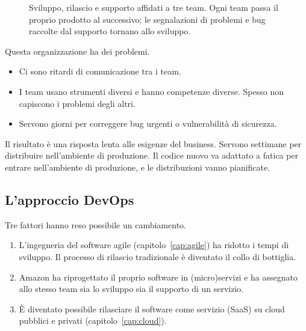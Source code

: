 \begin{figure}[ht]
\centering
{}
\caption{Sviluppo, rilascio e supporto affidati a tre team. Ogni team passa il proprio prodotto al successivo; le
segnalazioni di problemi e bug raccolte dal supporto tornano allo sviluppo.}
\label{fig:devops-team}
\end{figure}

Questa organizzazione ha dei problemi.
\begin{itemize}
  \item Ci sono ritardi di comunicazione tra i team.
  \item I team usano strumenti diversi e hanno competenze diverse. Spesso non capiscono i problemi degli altri.
  \item Servono giorni per correggere bug urgenti o vulnerabilità di sicurezza.
\end{itemize}
Il risultato è una risposta lenta alle esigenze del business. Servono settimane per distribuire nell'ambiente di
produzione. Il codice nuovo va adattato a fatica per entrare nell'ambiente di produzione, e le distribuzioni vanno
pianificate.

\subsection{L'approccio DevOps}
\label{sec:devops-approccio}

Tre fattori hanno reso possibile un cambiamento.
\begin{enumerate}
  \item L'ingegneria del software agile (capitolo~\ref{cap:agile}) ha ridotto i tempi di sviluppo. Il processo di
    rilascio tradizionale è diventato il collo di bottiglia.
  \item Amazon ha riprogettato il proprio software in (micro)servizi e ha assegnato allo stesso team sia lo sviluppo
    sia il supporto di un servizio.
  \item È diventato possibile rilasciare il software come servizio (SaaS) su cloud pubblici e privati
    (capitolo~\ref{cap:cloud}).
\end{enumerate}

